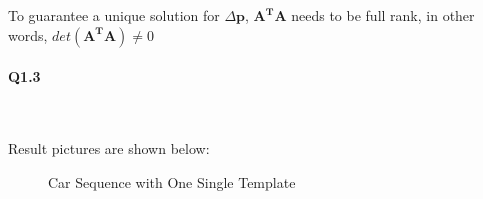\documentclass[11pt]{article} \usepackage{fullpage} \usepackage{graphicx} \usepackage{epstopdf} \usepackage{color} \usepackage{psfrag} \usepackage{pdfsync}\usepackage{indentfirst}\usepackage{subfigure}\usepackage{float}\usepackage[section]{placeins}
\begin{document}
To guarantee a unique solution for $\Delta\mathbf{p}$, $\mathbf{A^TA}$ needs to be full rank, in other words, $det\left(\mathbf{A^TA} \right) \ne 0$

\paragraph{Q1.3}~{}

Result pictures are shown below:
\begin{figure}[H]
\centering
{}
\caption{Car Sequence with One Single Template}
\end{figure}
\end{document}

